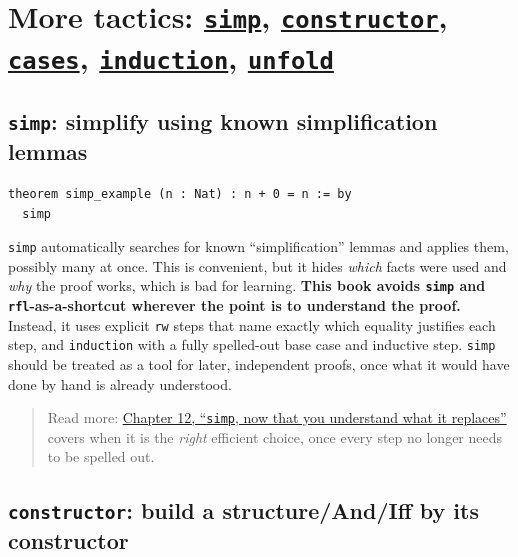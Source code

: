 \section{\texorpdfstring{More tactics: \href{https://lean-lang.org/doc/reference/latest/Tactic-Proofs/Tactic-Reference/}{\texttt{simp}}, \href{https://lean-lang.org/doc/reference/latest/Tactic-Proofs/Tactic-Reference/}{\texttt{constructor}}, \href{https://lean-lang.org/doc/reference/latest/Tactic-Proofs/Tactic-Reference/}{\texttt{cases}}, \href{https://lean-lang.org/doc/reference/latest/Tactic-Proofs/Tactic-Reference/}{\texttt{induction}}, \href{https://lean-lang.org/doc/reference/latest/Tactic-Proofs/Tactic-Reference/}{\texttt{unfold}}}{More tactics: simp, constructor, cases, induction, unfold}}\label{sec:04-tactics:04-more-tactics:1}

\subsection{\texorpdfstring{\texttt{simp}: simplify using known simplification lemmas}{simp: simplify using known simplification lemmas}}\label{sec:04-tactics:04-more-tactics:2}

\begin{lstlisting}
theorem simp_example (n : Nat) : n + 0 = n := by
  simp
\end{lstlisting}

\texttt{simp} automatically searches for known ``simplification'' lemmas and applies them, possibly many at once. This is convenient, but it hides \emph{which} facts were used and \emph{why} the proof works, which is bad for learning. \textbf{This book avoids \texttt{simp} and \texttt{rfl}-as-a-shortcut wherever the point is to understand the proof.} Instead, it uses explicit \texttt{rw} steps that name exactly which equality justifies each step, and \texttt{induction} with a fully spelled-out base case and inductive step. \texttt{simp} should be treated as a tool for later, independent proofs, once what it would have done by hand is already understood.

\begin{quote}
Read more: \hyperref[sec:12-working-efficiently:03-simp:1]{Chapter 12, ``\texttt{simp}, now that you understand what it replaces''} covers when it is the \emph{right} efficient choice, once every step no longer needs to be spelled out.
\end{quote}

\subsection{\texorpdfstring{\texttt{constructor}: build a structure/And/Iff by its constructor}{constructor: build a structure/And/Iff by its constructor}}\label{sec:04-tactics:04-more-tactics:3}

